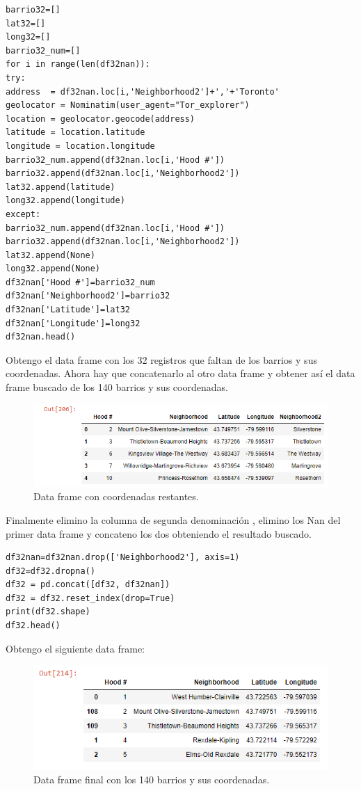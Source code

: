\documentclass[10pt,a4paper,arial, spanish]{article}
\begin{document}
\begin{verbatim}
barrio32=[]
lat32=[]
long32=[]
barrio32_num=[]
for i in range(len(df32nan)):
try:
address  = df32nan.loc[i,'Neighborhood2']+','+'Toronto'
geolocator = Nominatim(user_agent="Tor_explorer")
location = geolocator.geocode(address)
latitude = location.latitude
longitude = location.longitude
barrio32_num.append(df32nan.loc[i,'Hood #'])
barrio32.append(df32nan.loc[i,'Neighborhood2'])
lat32.append(latitude)
long32.append(longitude)
except:
barrio32_num.append(df32nan.loc[i,'Hood #'])
barrio32.append(df32nan.loc[i,'Neighborhood2'])
lat32.append(None)
long32.append(None)
df32nan['Hood #']=barrio32_num
df32nan['Neighborhood2']=barrio32
df32nan['Latitude']=lat32
df32nan['Longitude']=long32
df32nan.head()
\end{verbatim}
Obtengo el data frame con los 32 registros que faltan de los barrios y sus coordenadas. Ahora hay que concatenarlo al otro data frame y obtener así el data frame buscado de los 140 barrios y sus coordenadas.
\begin{figure}[H]
	\centering
	\includegraphics[scale=0.5]{df2}
	\caption[Data frame con coordenadas restante]{Data frame con coordenadas restantes.}
	\label{fig:df2}
\end{figure}

Finalmente elimino la columna de segunda denominación , elimino los Nan del primer data frame y concateno los dos obteniendo el resultado buscado.
\begin{verbatim}
df32nan=df32nan.drop(['Neighborhood2'], axis=1)
df32=df32.dropna()
df32 = pd.concat([df32, df32nan])
df32 = df32.reset_index(drop=True)
print(df32.shape)
df32.head()
\end{verbatim}

Obtengo el siguiente data frame:
\begin{figure}[h]
	\centering
	\includegraphics[scale=0.5]{df3}
	\caption[Data frame final.]{Data frame final con los 140 barrios y sus coordenadas.}
	\label{fig:df3}
\end{figure}
\end{document}
